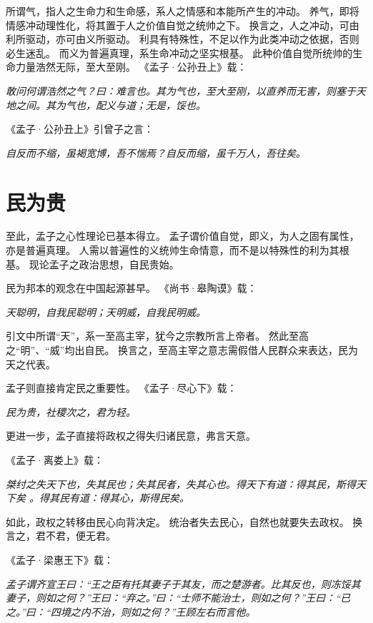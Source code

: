 \documentclass[11pt]{article}
\begin{document}
\newline

所谓气，指人之生命力和生命感，系人之情感和本能所产生的冲动。
养气，即将情感冲动理性化，将其置于人之价值自觉之统帅之下。
换言之，人之冲动，可由利所驱动，亦可由义所驱动。
利具有特殊性，不足以作为此类冲动之依据，否则必生迷乱。
而义为普遍真理，系生命冲动之坚实根基。
此种价值自觉所统帅的生命力量浩然无际，至大至刚。
《孟子·公孙丑上》载：

\textit{敢问何谓浩然之气？曰：难言也。其为气也，至大至刚，以直养而无害，则塞于天地之间。其为气也，配义与道；无是，馁也。}

《孟子·公孙丑上》引曾子之言：

\textit{自反而不缩，虽褐宽博，吾不惴焉？自反而缩，虽千万人，吾往矣。}

  
\section{民为贵}
至此，孟子之心性理论已基本得立。
孟子谓价值自觉，即义，为人之固有属性，亦是普遍真理。
人需以普遍性的义统帅生命情意，而不是以特殊性的利为其根基。
现论孟子之政治思想，自民贵始。

\newline

民为邦本的观念在中国起源甚早。
《尚书·皋陶谟》载：
  
\textit{天聪明，自我民聪明；天明威，自我民明威。}

引文中所谓“天”，系一至高主宰，犹今之宗教所言上帝者。
然此至高之“明”、“威”均出自民。
换言之，至高主宰之意志需假借人民群众来表达，民为天之代表。

\newline

孟子则直接肯定民之重要性。
《孟子·尽心下》载：

\textit{民为贵，社稷次之，君为轻。}

更进一步，孟子直接将政权之得失归诸民意，弗言天意。

《孟子·离娄上》载：

\textit{桀纣之失天下也，失其民也；失其民者，失其心也。得天下有道：得其民，斯得天下矣 。得其民有道：得其心，斯得民矣。}

如此，政权之转移由民心向背决定。
统治者失去民心，自然也就要失去政权。
换言之，君不君，便无君。

《孟子·梁惠王下》载：
  
\textit{孟子谓齐宣王曰：“王之臣有托其妻子于其友，而之楚游者。比其反也，则冻馁其妻子，则如之何？”王曰：“弃之。”曰：“士师不能治士，则如之何？”王曰：“已之。”曰：“四境之内不治，则如之何？”王顾左右而言他。}
\end{document}
